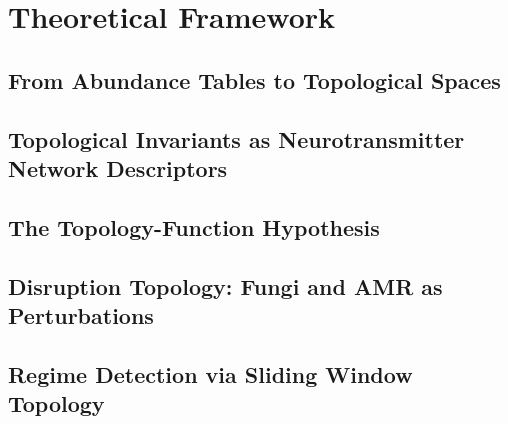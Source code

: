 \section{Theoretical Framework}
\label{sec:framework}


\subsection{From Abundance Tables to Topological Spaces}
%

\subsection{Topological Invariants as Neurotransmitter Network Descriptors}
%

\subsection{The Topology-Function Hypothesis}

\subsection{Disruption Topology: Fungi and AMR as Perturbations}

\subsection{Regime Detection via Sliding Window Topology}
